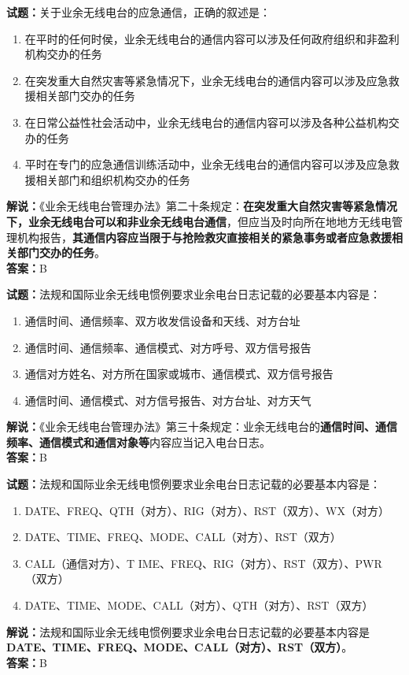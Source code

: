 \documentclass{ctexbook}
\begin{document}
\bigskip


\noindent\textbf{试题：}关于业余无线电台的应急通信，正确的叙述是：
\begin{enumerate}[leftmargin=3em]
\item 在平时的任何时侯，业余无线电台的通信内容可以涉及任何政府组织和非盈利机构交办的任务
\item 在突发重大自然灾害等紧急情况下，业余无线电台的通信内容可以涉及应急救援相关部门交办的任务
\item 在日常公益性社会活动中，业余无线电台的通信内容可以涉及各种公益机构交办的任务
\item 平时在专门的应急通信训练活动中，业余无线电台的通信内容可以涉及应急救援相关部门和组织机构交办的任务
\end{enumerate}
\noindent\textbf{解说：}《业余无线电台管理办法》第二十条规定：\textbf{在突发重大自然灾害等紧急情况下，业余无线电台可以和非业余无线电台通信}，但应当及时向所在地地方无线电管理机构报告，\textbf{其通信内容应当限于与抢险救灾直接相关的紧急事务或者应急救援相关部门交办的任务}。\\\noindent\textbf{答案：}B




\bigskip


\noindent\textbf{试题：}法规和国际业余无线电惯例要求业余电台日志记载的必要基本内容是：
\begin{enumerate}[leftmargin=3em]
\item 通信时间、通信频率、双方收发信设备和天线、对方台址
\item 通信时间、通信频率、通信模式、对方呼号、双方信号报告
\item 通信对方姓名、对方所在国家或城市、通信模式、双方信号报告
\item 通信时间、通信模式、对方信号报告、对方台址、对方天气
\end{enumerate}
\noindent\textbf{解说：}《业余无线电台管理办法》第三十条规定：业余无线电台的\textbf{通信时间、通信频率、通信模式和通信对象等}内容应当记入电台日志。\\\noindent\textbf{答案：}B



\bigskip


\noindent\textbf{试题：}法规和国际业余无线电惯例要求业余电台日志记载的必要基本内容是：
\begin{enumerate}[leftmargin=3em]
\item DATE、FREQ、QTH（对方）、RIG（对方）、RST（双方）、WX（对方）
\item DATE、TIME、FREQ、MODE、CALL（对方）、RST（双方）
\item CALL（通信对方）、T IME、FREQ、RIG（对方）、RST（双方）、PWR（双方）
\item DATE、TIME、MODE、CALL（对方）、QTH（对方）、RST（双方）
\end{enumerate}
\noindent\textbf{解说：}法规和国际业余无线电惯例要求业余电台日志记载的必要基本内容是\textbf{DATE、TIME、FREQ、MODE、CALL（对方）、RST（双方）}。\\\noindent\textbf{答案：}B
\end{document}
